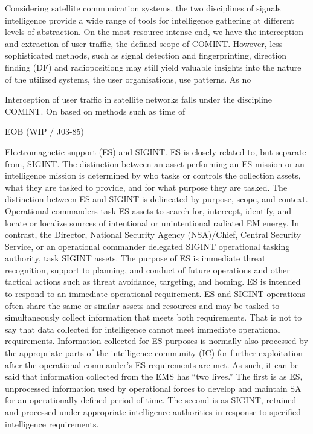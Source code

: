 \documentclass[english, 12pt, a4paper, elec, utf8, a-1b, online]{aaltothesis}
\begin{document}
Considering satellite communication systems, the two disciplines of signals intelligence provide a wide range of tools for intelligence gathering at different levels of abstraction.
On the most resource-intense end, we have the interception and extraction of user traffic, the defined scope of COMINT.
However, less sophisticated methods, such as signal detection and fingerprinting, direction finding (DF) and radiopositiong may still yield valuable insights into the nature of the utilized systems, the user organisations, use patterns.
As no 

Interception of user traffic in satellite networks falls under the discipline COMINT. On  based on methods such as time of 

EOB (WIP / J03-85)

Electromagnetic support (ES) and SIGINT.
ES is closely related to, but separate from, SIGINT.
The distinction between an asset performing an ES mission or an intelligence mission is
determined by who tasks or controls the collection assets, what they are tasked to provide,
and for what purpose they are tasked.
The distinction between ES and SIGINT is
delineated by purpose, scope, and context.
Operational commanders task ES assets to
search for, intercept, identify, and locate or localize sources of intentional or unintentional
radiated EM energy.
In contrast, the Director, National Security Agency (NSA)/Chief,
Central Security Service, or an operational commander delegated SIGINT operational
tasking authority, task SIGINT assets.
The purpose of ES is immediate threat recognition,
support to planning, and conduct of future operations and other tactical actions such as
threat avoidance, targeting, and homing.
ES is intended to respond to an immediate
operational requirement.
ES and SIGINT operations often share the same or similar assets
and resources and may be tasked to simultaneously collect information that meets both
requirements.
That is not to say that data collected for intelligence cannot meet immediate
operational requirements.
Information collected for ES purposes is normally also
processed by the appropriate parts of the intelligence community (IC) for further
exploitation after the operational commander’s ES requirements are met.
As such, it can
be said that information collected from the EMS has “two lives.” The first is as ES,
unprocessed information used by operational forces to develop and maintain SA for an
operationally defined period of time.
The second is as SIGINT, retained and processed
under appropriate intelligence authorities in response to specified intelligence
requirements.
\end{document}
